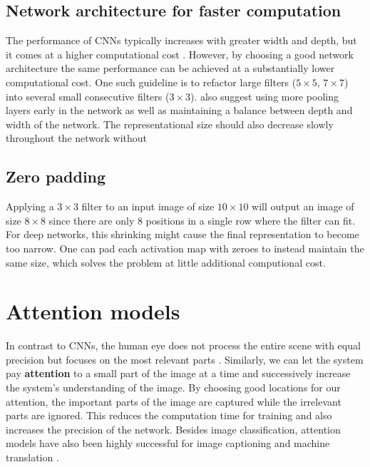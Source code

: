 \subsection{Network architecture for faster computation}

The performance of CNNs typically increases with greater width and depth, but it comes at a higher computational cost \cite{InceptionV3}. However, by choosing a good network architecture the same performance can be achieved at a substantially lower computational cost. One such guideline is to refactor large filters ($5 \times 5$, $7 \times 7$) into several small consecutive filters ($3 \times 3$). \textcite{InceptionV3} also suggest using more pooling layers early in the network as well as maintaining a balance between depth and width of the network. The representational size should also decrease slowly throughout the network without


\subsection{Zero padding}

Applying a $3 \times 3$ filter to an input image of size $10 \times 10$ will output an image of size $8 \times 8$ since there are only 8 positions in a single row where the filter can fit. For deep networks, this shrinking might cause the final representation to become too narrow.
One can pad each activation map with zeroes to instead maintain the same size, which solves the problem at little additional computional cost.

\section{Attention models}
\label{ssec:attention}


In contrast to CNNs, the human eye does not process the entire scene with equal precision but focuses on the most relevant parts \cite{DeepMindAttention}.
Similarly, we can let the system pay \textbf{attention} to a small part of the image at a time and successively increase the system's understanding of the image.
By choosing good locations for our attention, the important parts of the image are captured while the irrelevant parts are ignored.
This reduces the computation time for training and also increases the precision of the network.
Besides image classification, attention models have also been highly successful for image captioning \cite{AttendAndTell} and machine translation \cite{machine_translation_attention}.

